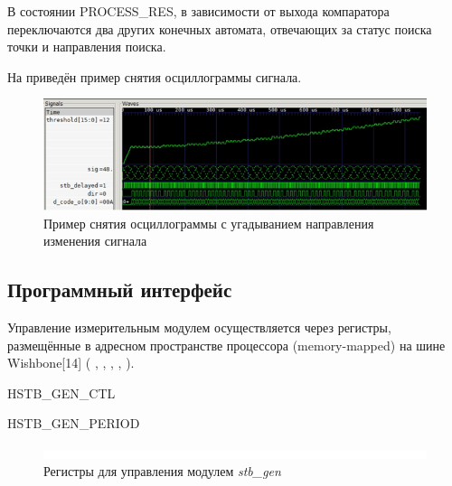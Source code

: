 В состоянии PROCESS\_RES, в зависимости от выхода компаратора переключаются два других конечных автомата, отвечающих за статус поиска точки и направления поиска.

На  приведён пример снятия осциллограммы сигнала.

\begin{figure}[ht!] 
	\center
	\includegraphics  {my_folder/images//p_find}
	\caption{Пример снятия осциллограммы с угадыванием направления изменения сигнала} 
	\label{fig:p-find}  
\end{figure}

\subsection{Программный интерфейс}

Управление измерительным модулем осуществляется через регистры, размещённые в адресном пространстве процессора (memory-mapped) на шине Wishbone[14] ( , ,
, , ).

\begin{register}{H}{STB\_GEN\_CTL}{}%
\label{example}%
%
%
%
%
 \regnewline%

%
%
%
%
\regnewline%
\end{register}

\begin{register}{H}{STB\_GEN\_PERIOD}{}%
\label{example}%
%
 \regnewline%
\end{register}

\begin{figure}[ht!] 
	\center
	\includegraphics  {my_folder/images//blank}
	\caption{Регистры для управления модулем \emph{stb\_gen}} 
	\label{fig:stb-reg}  
\end{figure}

